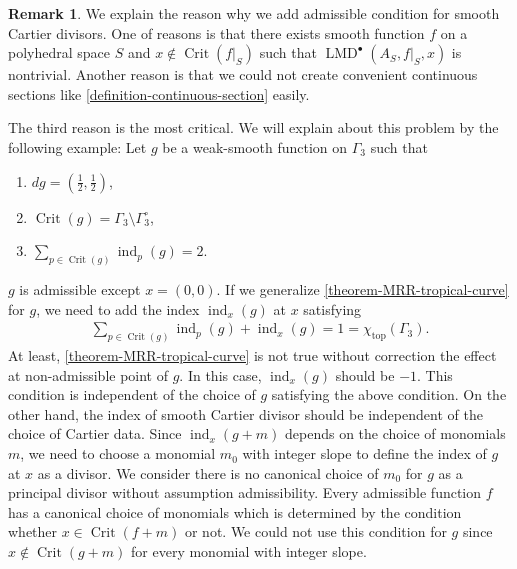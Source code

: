 \documentclass[a4paper,dvipdfmx,reqno,12pt]{amsart}
\theoremstyle{definition}
\newtheorem{remark}[theorem]{Remark}
\newcommand{\opn}[1]{\operatorname{#1}}
\numberwithin{equation}{section}
\begin{document}
\begin{remark}
\label{remark-non-admissible-divisor}
We explain the reason why we add admissible condition for 
smooth Cartier divisors. 
One of reasons is that there exists smooth function $f$
on a polyhedral space $S$ and 
$x\notin\opn{Crit}(f|_S)$ such that
$\opn{LMD}^{\bullet}(A_S,f|_{S},x)$ is nontrivial.
Another reason is that we could not create 
convenient continuous sections like 
\cref{definition-continuous-section} easily.

The third reason is the most critical. 
We will explain about this problem by the following 
example:
Let 
$g$ be a weak-smooth function on 
$\Gamma_3$
such that 
\begin{enumerate}
\item $dg=(\frac{1}{2},\frac{1}{2})$,
\item $\opn{Crit}(g)=\Gamma_3\setminus \Gamma_3^{\circ}$,
\item $\sum_{p\in \opn{Crit}(g)}\opn{ind}_p(g)=2$.
\end{enumerate}
$g$ is admissible except $x=(0,0)$.
If we generalize 
\cref{theorem-MRR-tropical-curve} for $g$, 
we need to add the index $\opn{ind}_x(g)$ at $x$ satisfying
\begin{align}
\sum_{p\in \opn{Crit}(g)}\opn{ind}_p(g)+
\opn{ind}_x(g)=1=\chi_{\opn{top}}(\Gamma_3).
\end{align}
At least, \cref{theorem-MRR-tropical-curve} is not
true without correction the effect at non-admissible point
of $g$.
In this case, $\opn{ind}_x(g)$ should be $-1$.
This condition is independent of the choice
of $g$ satisfying the above condition.
On the other hand, the index of smooth Cartier
divisor should be independent of the choice of
Cartier data.
Since $\opn{ind}_x(g+m)$ depends on the choice
of monomials $m$, we need to choose a monomial $m_0$
with integer slope to 
define the index of $g$ at $x$ as a divisor.
We consider there is no canonical choice
of $m_0$ for $g$ as a principal divisor without
assumption admissibility.
Every admissible function $f$ has a canonical choice
of monomials which is determined by the condition 
whether $x\in \opn{Crit}(f+m)$ or not.
We could not use this condition for $g$ since 
$x\notin \opn{Crit}(g+m)$ for every monomial with
integer slope.
\end{remark}

\end{document}
